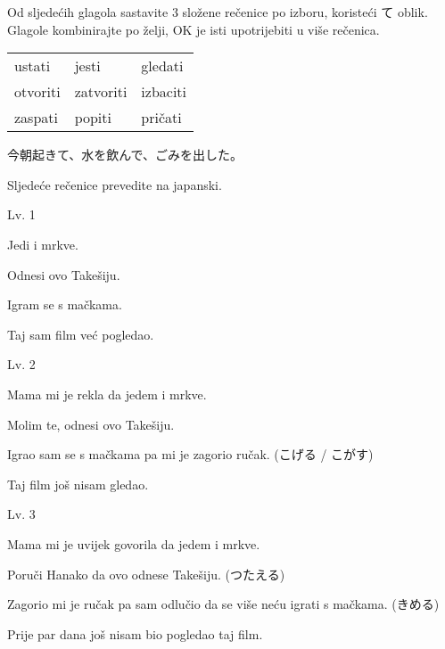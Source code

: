 
\author{Tomislav Mamić}

	
	\noindent Od sljedećih glagola sastavite 3 složene rečenice po izboru, koristeći て oblik. Glagole kombinirajte po želji, OK je isti upotrijebiti u više rečenica.
	
	\vspace{5pt}
	\begin{tabular}{l l l}
		ustati & jesti & gledati \\
		otvoriti & zatvoriti & izbaciti \\
		zaspati & popiti & pričati \\
	\end{tabular}

	 今朝起きて、水を飲んで、ごみを出した。

	\vspace{15pt}
	\noindent Sljedeće rečenice prevedite na japanski.

	\begin{mondai}{Lv. 1}
		\item Jedi i mrkve.
		\item Odnesi ovo Takešiju.
		\item Igram se s mačkama.
		\item Taj sam film već pogledao.
	\end{mondai}

	\begin{mondai}{Lv. 2}
		\item Mama mi je rekla da jedem i mrkve.
		\item Molim te, odnesi ovo Takešiju.
		\item Igrao sam se s mačkama pa mi je zagorio ručak. (こげる / こがす)
		\item Taj film još nisam gledao.
	\end{mondai}

	\begin{mondai}{Lv. 3}
		\item Mama mi je uvijek govorila da jedem i mrkve.
		\item Poruči Hanako da ovo odnese Takešiju. (つたえる)
		\item Zagorio mi je ručak pa sam odlučio da se više neću igrati s mačkama. (きめる)
		\item Prije par dana još nisam bio pogledao taj film.
	\end{mondai}
